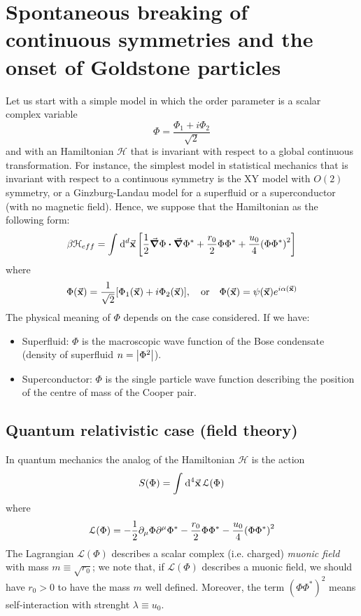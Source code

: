 \documentclass[../main/main.tex]{subfiles}
\begin{document}
\section{Spontaneous breaking of continuous symmetries and the onset of Goldstone particles}
Let us start with a simple model in which the order parameter is a scalar complex variable
\begin{equation*}
  \Phi = \frac{\Phi _1 + i \Phi _2}{\sqrt{2} }
\end{equation*}
and with an Hamiltonian \( \mathcal{H} \) that is invariant with respect to a global continuous transformation. For instance, the simplest model in statistical mechanics that is invariant with respect to a continuous symmetry is the XY model with \( O(2) \) symmetry, or a Ginzburg-Landau model for a superfluid or a superconductor (with no magnetic field). Hence, we suppose that the Hamiltonian as the following form:
\begin{equation*}
  \beta \mathcal{H}_{eff} = \int_{}^{} \dd[d]{\va{x}} \qty[ \frac{1}{2} \va{\grad }\Phi \vdot \va{\grad } \Phi ^* + \frac{r_0}{2} \Phi  \Phi^* + \frac{u_0}{4} \qty(\Phi \Phi^* )^2 ]
\end{equation*}
where
\begin{equation*}
  \Phi (\va{x}) = \frac{1}{\sqrt{2} } \qty[ \Phi _1 (\va{x}) + i \Phi _2 (\va{x})], \quad \text{or} \quad \Phi (\va{x}) = \psi (\va{x}) e^{i \alpha (\va{x})}
\end{equation*}
The physical meaning of \( \Phi  \) depends on the case considered. If we have:

\begin{itemize}
\item Superfluid: \( \Phi  \) is the macroscopic wave function of the Bose condensate (density of superfluid \( n= \abs{\Phi ^2}  \)).
\item Superconductor: \( \Phi  \) is the single particle wave function describing the position of the centre of mass of the Cooper pair.
\end{itemize}

\subsection{Quantum relativistic case (field theory)}
In quantum mechanics the analog of the Hamiltonian \( \mathcal{H} \) is the action
\begin{equation}
  S(\Phi ) = \int_{}^{} \dd[4]{\va{x}}   \mathcal{L} ( \Phi )
\end{equation}
where
\begin{equation}
  \mathcal{L} (\Phi ) = - \frac{1}{2} \partial_\mu \Phi \partial^\mu \Phi ^*
  - \frac{r_0}{2} \Phi \Phi ^* - \frac{u_0}{4} \qty(\Phi \Phi ^*)^2
  \label{eq:n_8}
\end{equation}
The Lagrangian \( \mathcal{L} (\Phi ) \) describes a scalar complex (i.e. charged) \emph{muonic field} with mass \( m \equiv \sqrt{r_0} \); we note that, if  \( \mathcal{L} (\Phi ) \) describes a muonic field, we should have \( r_0>0 \) to have the mass \( m \) well defined. Moreover, the term \( (\Phi \Phi ^*)^2 \) means self-interaction with strenght \( \lambda \equiv u_0 \).
\end{document}
